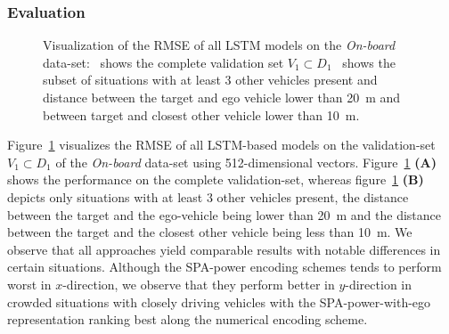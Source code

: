 \subsubsection{Evaluation}%
\label{ssubsec:evaluation_lstms}

\begin{figure}[t!]
	\centering
    \vspace{-0.3cm}
    \caption{Visualization of the \ac{RMSE} of all \ac{LSTM} models on the \emph{On-board} data-set:~\protect{} shows the complete validation set $V_1 \subset D_1$~\protect{} shows the subset of situations with at least \num{3} other vehicles present and distance between the target and ego vehicle lower than  \SI{20}{\meter} and between target and closest other vehicle lower than \SI{10}{\meter}.}\label{fig:rmse_on_board_all}
\end{figure}

Figure~\ref{fig:rmse_on_board_all} visualizes the \ac{RMSE} of all \ac{LSTM}-based models on the validation-set $V_1 \subset D_1$ of the \emph{On-board} data-set using \num{512}-dimensional vectors.
Figure~\ref{fig:rmse_on_board_all} \textbf{(A)} shows the performance on the complete validation-set, whereas figure~\ref{fig:rmse_on_board_all} \textbf{(B)} depicts only situations with at least \num{3} other vehicles present, the distance between the target and the ego-vehicle being lower than \SI{20}{\meter} and the distance between the target and the closest other vehicle being less than \SI{10}{\meter}.
We observe that all approaches yield comparable results with notable differences in certain situations.
Although the \ac{SPA}-power encoding schemes tends to perform worst in $x$-direction, we observe that they perform better in $y$-direction in crowded situations with closely driving vehicles with the \ac{SPA}-power-with-ego representation ranking best along the numerical encoding scheme.

